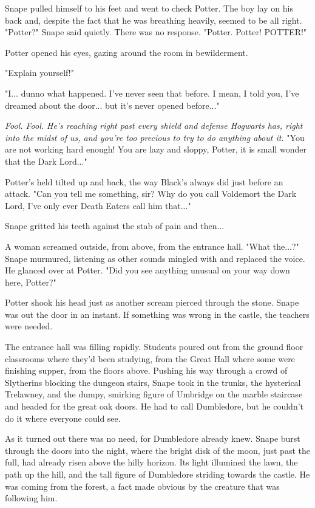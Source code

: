 \documentclass[a4paper,11pt]{article}
\begin{document}
Snape pulled himself to his feet and went to check Potter. The boy lay on his back and, despite the fact that he was breathing heavily, seemed to be all right. "Potter?" Snape said quietly. There was no response. "Potter. Potter! POTTER!"

Potter opened his eyes, gazing around the room in bewilderment.

"Explain yourself!"

"I... dunno what happened. I've never seen that before. I mean, I told you, I've dreamed about the door... but it's never opened before..."

\emph{Fool. Fool. He's reaching right past every shield and defense Hogwarts has, right into the midst of us, and you're too precious to try to do anything about it.} "You are not working hard enough! You are lazy and sloppy, Potter, it is small wonder that the Dark Lord..."

Potter's held tilted up and back, the way Black's always did just before an attack. "Can you tell me something, sir? Why do you call Voldemort the Dark Lord, I've only ever Death Eaters call him that..."

Snape gritted his teeth against the stab of pain and then...

A woman screamed outside, from above, from the entrance hall. "What the...?" Snape murmured, listening as other sounds mingled with and replaced the voice. He glanced over at Potter. "Did you see anything unusual on your way down here, Potter?"

Potter shook his head just as another scream pierced through the stone. Snape was out the door in an instant. If something was wrong in the castle, the teachers were needed.

The entrance hall was filling rapidly. Students poured out from the ground floor classrooms where they'd been studying, from the Great Hall where some were finishing supper, from the floors above. Pushing his way through a crowd of Slytherins blocking the dungeon stairs, Snape took in the trunks, the hysterical Trelawney, and the dumpy, smirking figure of Umbridge on the marble staircase and headed for the great oak doors. He had to call Dumbledore, but he couldn't do it where everyone could see.

As it turned out there was no need, for Dumbledore already knew. Snape burst through the doors into the night, where the bright disk of the moon, just past the full, had already risen above the hilly horizon. Its light illumined the lawn, the path up the hill, and the tall figure of Dumbledore striding towards the castle. He was coming from the forest, a fact made obvious by the creature that was following him.
\end{document}
